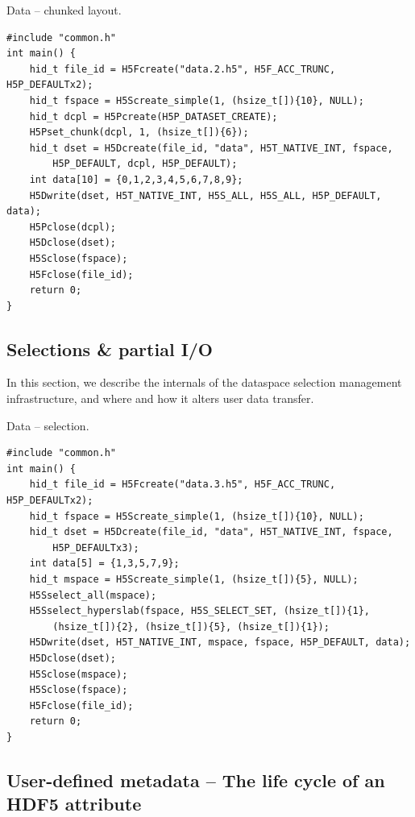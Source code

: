 \begin{listing}
\centering
\caption{Data -- chunked layout.}
\label{lst:dataset-chunky}
\begin{verbatim}
#include "common.h"
int main() {
    hid_t file_id = H5Fcreate("data.2.h5", H5F_ACC_TRUNC, H5P_DEFAULTx2);
    hid_t fspace = H5Screate_simple(1, (hsize_t[]){10}, NULL);
    hid_t dcpl = H5Pcreate(H5P_DATASET_CREATE);
    H5Pset_chunk(dcpl, 1, (hsize_t[]){6});
    hid_t dset = H5Dcreate(file_id, "data", H5T_NATIVE_INT, fspace,
        H5P_DEFAULT, dcpl, H5P_DEFAULT);
    int data[10] = {0,1,2,3,4,5,6,7,8,9};
    H5Dwrite(dset, H5T_NATIVE_INT, H5S_ALL, H5S_ALL, H5P_DEFAULT, data);
    H5Pclose(dcpl);
    H5Dclose(dset);
    H5Sclose(fspace);
    H5Fclose(file_id);
    return 0;
}
\end{verbatim}
\end{listing}

\subsection{Selections \& partial I/O}\label{sec:selections}

In this section, we describe the internals of the dataspace selection management infrastructure, and where and how it alters user data transfer.

\begin{listing}
\centering
\caption{Data -- selection.}
\label{lst:dataset-selection}
\begin{verbatim}
#include "common.h"
int main() {
    hid_t file_id = H5Fcreate("data.3.h5", H5F_ACC_TRUNC, H5P_DEFAULTx2);
    hid_t fspace = H5Screate_simple(1, (hsize_t[]){10}, NULL);
    hid_t dset = H5Dcreate(file_id, "data", H5T_NATIVE_INT, fspace,
        H5P_DEFAULTx3);
    int data[5] = {1,3,5,7,9};
    hid_t mspace = H5Screate_simple(1, (hsize_t[]){5}, NULL);
    H5Sselect_all(mspace);
    H5Sselect_hyperslab(fspace, H5S_SELECT_SET, (hsize_t[]){1},
        (hsize_t[]){2}, (hsize_t[]){5}, (hsize_t[]){1});
    H5Dwrite(dset, H5T_NATIVE_INT, mspace, fspace, H5P_DEFAULT, data);
    H5Dclose(dset);
    H5Sclose(mspace);
    H5Sclose(fspace);
    H5Fclose(file_id);
    return 0;
}
\end{verbatim}
\end{listing}

\subsection{User-defined metadata -- The life cycle of an HDF5 attribute}

